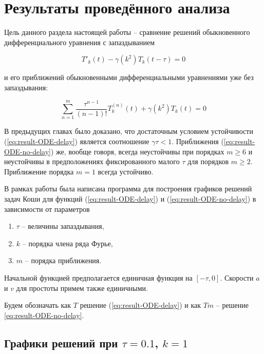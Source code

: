 \section{Результаты проведённого анализа}

Цель данного раздела настоящей работы \--- сравнение решений обыкновенного дифференциального уравнения с запаздыванием

\begin{equation}\label{eq:result-ODE-delay}
{T'}_{k}(t) - \gamma(k^2) T_k(t-\tau)=0
\end{equation}

и его приближений обыкновенными дифференциальными уравнениями уже без запаздывания:

\begin{equation}\label{eq:result-ODE-no-delay}
\sum\limits_{n=1}^{m} \dfrac{\tau^{n-1}}{(n-1)!} T_k^{(n)} (t) + \gamma(k^2) T_k (t) = 0
\end{equation}

В предыдущих главах было доказано, что достаточным условием устойчивости (\ref{eq:result-ODE-delay}) является соотношение $\gamma \tau <1$. Приближения (\ref{eq:result-ODE-no-delay}) же, вообще говоря, всегда неустойчивы при порядках $m \geq 6$ и неустойчивы в предположениях фиксированного малого $\tau$ для порядков $m \geq 2$. Приближение порядка $m=1$ всегда устойчиво.

В рамках работы была написана программа для построения графиков решений задач Коши для функций (\ref{eq:result-ODE-delay}) и (\ref{eq:result-ODE-no-delay}) в зависимости от параметров 

\begin{enumerate}
\item $\tau$ \--- величины запаздывания,
\item $k$ \--- порядка члена ряда Фурье,
\item $m$ \--- порядка приближения.
\end{enumerate}

Начальной функцией предполагается единичная функция на $[-\tau,0]$. Скорости $a$ и $v$ для простоты примем также единичными.

Будем обозначать как $T$ \- решение (\ref{eq:result-ODE-delay}) и как $Tm$ \--- решение \ref{eq:result-ODE-no-delay}.

\newpage

\subsection{Графики решений при $\tau=0.1$, $k=1$}\label{sec:graph_1}

